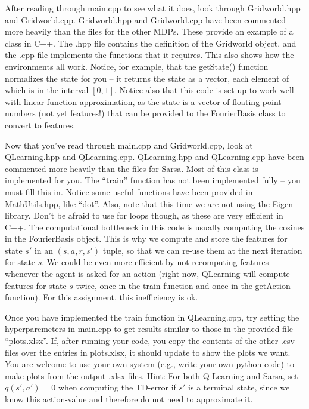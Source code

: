 \documentclass[]{article}
\begin{document}
After reading through main.cpp to see what it does, look through Gridworld.hpp and Gridworld.cpp. Gridworld.hpp and Gridworld.cpp have been commented more heavily than the files for the other MDPs. These provide an example of a class in C++. The .hpp file contains the definition of the Gridworld object, and the .cpp file implements the functions that it requires. This also shows how the environments all work. Notice, for example, that the getState() function normalizes the state for you -- it returns the state as a vector, each element of which is in the interval $[0,1]$. Notice also that this code is set up to work well with linear function approximation, as the state is a vector of floating point numbers (not yet features!) that can be provided to the FourierBasis class to convert to features.

Now that you've read through main.cpp and Gridworld.cpp, look at QLearning.hpp and QLearning.cpp. QLearning.hpp and QLearning.cpp have been commented more heavily than the files for Sarsa. Most of this class is implemented for you. The ``train'' function has not been implemented fully -- you must fill this in. Notice some useful functions have been provided in MathUtils.hpp, like ``dot''. Also, note that this time we are not using the Eigen library. Don't be afraid to use for loops though, as these are very efficient in C++. The computational bottleneck in this code is usually computing the cosines in the FourierBasis object. This is why we compute and store the features for state $s'$ in an $(s,a,r,s')$ tuple, so that we can re-use them at the next iteration for state $s$. We could be even more efficient by not recomputing features whenever the agent is asked for an action (right now, QLearning will compute features for state $s$ twice, once in the train function and once in the getAction function). For this assignment, this inefficiency is ok.

Once you have implemented the train function in QLearning.cpp, try setting the hyperparemeters in main.cpp to get results similar to those in the provided file ``plots.xlsx''. If, after running your code, you copy the contents of the other .csv files over the entries in plots.xlsx, it should update to show the plots we want. You are welcome to use your own system (e.g., write your own python code) to make plots from the output .xlsx files. Hint: For both Q-Learning and Sarsa, set $q(s',a')=0$ when computing the TD-error if $s'$ is a terminal state, since we know this action-value and therefore do not need to approximate it.
\end{document}
